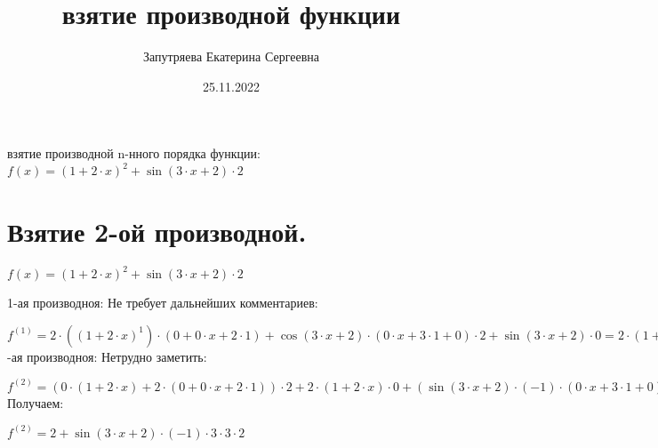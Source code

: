 \documentclass[12pt, letterpaper, twoside]{article}
\title{взятие производной функции}
\author{Запутряева Екатерина Сергеевна}
\date{25.11.2022}
\begin{document}
\maketitle
\newpage
взятие производной n-нного порядка функции: 
$ f(x) = {({1 + 2 \cdot x})}^{2} + \sin{(3 \cdot x + 2)} \cdot 2 $

\section{Взятие 2-ой производной.}

$ f(x) = {({1 + 2 \cdot x})}^{2} + \sin{(3 \cdot x + 2)} \cdot 2$

1-ая производноя:
\newline Не требует дальнейших комментариев:

$ {f}^{(1)} = 2 \cdot {({({1 + 2 \cdot x})}^{1})} \cdot {(0 + 0 \cdot x + 2 \cdot 1)} + \cos{(3 \cdot x + 2)} \cdot {(0 \cdot x + 3 \cdot 1 + 0)} \cdot 2 + \sin{(3 \cdot x + 2)} \cdot 0 = 2 \cdot {(1 + 2 \cdot x)} \cdot 2 + \cos{(3 \cdot x + 2)} \cdot 3 \cdot 2 $
-ая производноя:
\newline Нетрудно заметить:

$ {f}^{(2)} = {(0 \cdot {(1 + 2 \cdot x)} + 2 \cdot {(0 + 0 \cdot x + 2 \cdot 1)})} \cdot 2 + 2 \cdot {(1 + 2 \cdot x)} \cdot 0 + {(\sin{(3 \cdot x + 2)} \cdot (-1) \cdot {(0 \cdot x + 3 \cdot 1 + 0)} \cdot 3 + \cos{(3 \cdot x + 2)} \cdot 0)} \cdot 2 + \cos{(3 \cdot x + 2)} \cdot 3 \cdot 0 = 2 + \sin{(3 \cdot x + 2)} \cdot (-1) \cdot 3 \cdot 3 \cdot 2 $
\newline Получаем:

$ {f}^{(2)} = 2 + \sin{(3 \cdot x + 2)} \cdot (-1) \cdot 3 \cdot 3 \cdot 2 $
\end{document}
